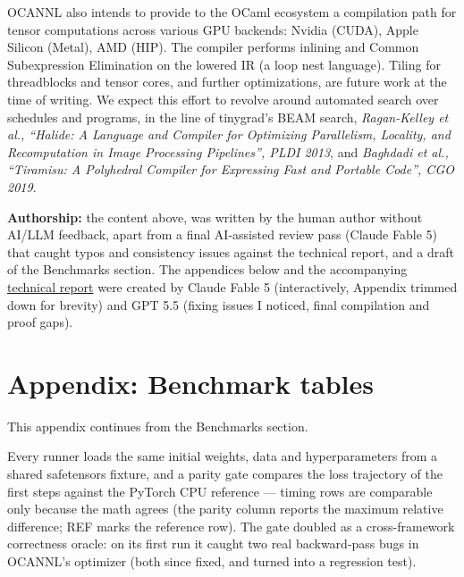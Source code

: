 \documentclass[
  10pt,
  letterpaper,
]{article}
\begin{document}
OCANNL also intends to provide to the OCaml ecosystem a compilation path
for tensor computations across various GPU backends: Nvidia (CUDA),
Apple Silicon (Metal), AMD (HIP). The compiler performs inlining and
Common Subexpression Elimination on the lowered IR (a loop nest
language). Tiling for threadblocks and tensor cores, and further
optimizations, are future work at the time of writing. We expect this
effort to revolve around automated search over schedules and programs,
in the line of tinygrad's BEAM search, \emph{Ragan-Kelley et al.,
``Halide: A Language and Compiler for Optimizing Parallelism, Locality,
and Recomputation in Image Processing Pipelines'', PLDI 2013}, and
\emph{Baghdadi et al., ``Tiramisu: A Polyhedral Compiler for Expressing
Fast and Portable Code'', CGO 2019}.

\textbf{Authorship:} the content above, was written by the human author
without AI/LLM feedback, apart from a final AI-assisted review pass
(Claude Fable 5) that caught typos and consistency issues against the
technical report, and a draft of the Benchmarks section. The appendices
below and the accompanying
\href{https://ahrefs.github.io/ocannl/docs/pdfs/ocannl-formal-core-technical-report.pdf}{technical
report} were created by Claude Fable 5 (interactively, Appendix trimmed
down for brevity) and GPT 5.5 (fixing issues I noticed, final
compilation and proof gaps).

\section{Appendix: Benchmark tables}\label{appendix-benchmark-tables}

This appendix continues from the Benchmarks section.

Every runner loads the same initial weights, data and hyperparameters
from a shared safetensors fixture, and a parity gate compares the loss
trajectory of the first steps against the PyTorch CPU reference ---
timing rows are comparable only because the math agrees (the parity
column reports the maximum relative difference; REF marks the reference
row). The gate doubled as a cross-framework correctness oracle: on its
first run it caught two real backward-pass bugs in OCANNL's optimizer
(both since fixed, and turned into a regression test).
\end{document}
